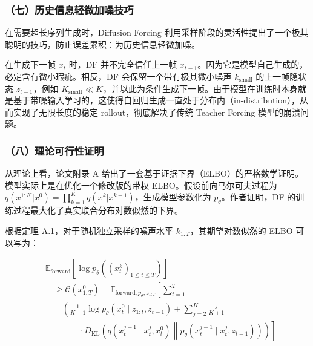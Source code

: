 \hypertarget{ux4e03ux5386ux53f2ux4fe1ux606fux8f7bux5faeux52a0ux566aux6280ux5de7}{%
\subsubsection{（七）历史信息轻微加噪技巧}\label{ux4e03ux5386ux53f2ux4fe1ux606fux8f7bux5faeux52a0ux566aux6280ux5de7}}

在需要超长序列生成时，Diffusion Forcing 利用采样阶段的灵活性提出了一个极其聪明的技巧，防止误差累积：为历史信息轻微加噪。

在生成下一帧 \(x_t\) 时，DF 并不完全信任上一帧 \(x_{t-1}\)。因为它是模型自己生成的，必定含有微小瑕疵。相反，DF 会保留一个带有极其微小噪声 \(k_{\mathrm{small}}\) 的上一帧隐状态 \(z_{t-1}\)，例如 \(K_{\mathrm{small}}\ll K\)，并以此为条件生成下一帧。由于模型在训练时本身就是基于带噪输入学习的，这使得自回归生成一直处于分布内（in-distribution），从而实现了无限长度的稳定 rollout，彻底解决了传统 Teacher Forcing 模型的崩溃问题。

\hypertarget{ux516bux7406ux8bbaux53efux884cux6027ux8bc1ux660e}{%
\subsubsection{（八）理论可行性证明}\label{ux516bux7406ux8bbaux53efux884cux6027ux8bc1ux660e}}

从理论上看，论文附录 A 给出了一套基于证据下界（ELBO）的严格数学证明。模型实际上是在优化一个修改版的带权 ELBO。假设前向马尔可夫过程为 \(q(x^{1:K}|x^0)=\prod_{k=1}^K q(x^k|x^{k-1})\)，生成模型参数化为 \(p_\theta\)。作者证明，DF 的训练过程最大化了真实联合分布对数似然的下界。

根据定理 A.1，对于随机独立采样的噪声水平 \(k_{1:T}\)，其期望对数似然的 ELBO 可以写为：

\[
\begin{aligned}
&\mathbb{E}_{\mathrm{forward}}
\left[
\log p_\theta\left((x_t^k)_{1\le t\le T}\right)
\right] \\
&\quad \ge \mathcal{C}(x_{1:T}^0)
+\mathbb{E}_{\mathrm{forward},p_\theta,z_{1:T}}
\left[
\sum_{t=1}^T
\right. \\
&\qquad \left.
\left(
\frac{1}{K+1}\log p_\theta(x_t^0\mid z_{1:t},z_{t-1})
+\sum_{j=2}^K\frac{j}{K+1}
\right.
\right. \\
&\qquad\qquad \left.\left.
{}\cdot D_{\mathrm{KL}}\left(
q(x_t^{j-1}\mid x_t^j,x_t^0)
\middle\|
p_\theta(x_t^{j-1}\mid x_t^j,z_{t-1})
\right)
\right)
\right]
\end{aligned}
\]

